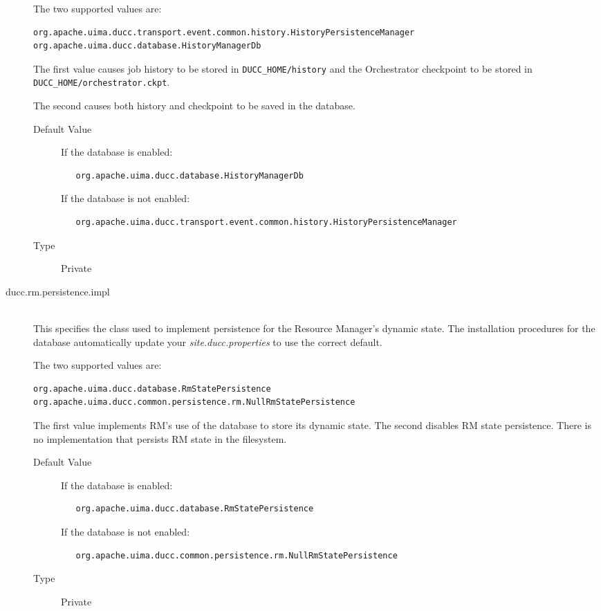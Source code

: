 \begin{description}
        The two supported values are:
\begin{verbatim}
org.apache.uima.ducc.transport.event.common.history.HistoryPersistenceManager
org.apache.uima.ducc.database.HistoryManagerDb
\end{verbatim}

        The first value causes job history to be stored in {\tt DUCC\_HOME/history}
        and the Orchestrator checkpoint to be stored in {\tt DUCC\_HOME/orchestrator.ckpt}.

        The second causes both history and checkpoint to be saved in the database.

        \begin{description}
          \item[Default Value] If the database is enabled:
\begin{verbatim}
   org.apache.uima.ducc.database.HistoryManagerDb
\end{verbatim}
            If the database is not enabled:
\begin{verbatim}
   org.apache.uima.ducc.transport.event.common.history.HistoryPersistenceManager
\end{verbatim}
          \item[Type] Private
        \end{description} 


      \item[ducc.rm.persistence.impl] \hfill \\
        This specifies the class used to implement persistence for the Resource Manager's
        dynamic state.  
        The installation procedures for the database automatically update your {\em site.ducc.properties}
        to use the correct default.

        The two supported values are:
\begin{verbatim}
org.apache.uima.ducc.database.RmStatePersistence
org.apache.uima.ducc.common.persistence.rm.NullRmStatePersistence
\end{verbatim}

        The first value implements RM's use of the database to store its dynamic state.  The second
        disables RM state persistence.  There is no implementation that persists RM state
        in the filesystem.

        \begin{description}
          \item[Default Value] If the
            database is enabled:
\begin{verbatim}
   org.apache.uima.ducc.database.RmStatePersistence
\end{verbatim}
            If the database is not enabled:
\begin{verbatim}
   org.apache.uima.ducc.common.persistence.rm.NullRmStatePersistence
\end{verbatim}
          \item[Type] Private
        \end{description} 
      \end{description}

